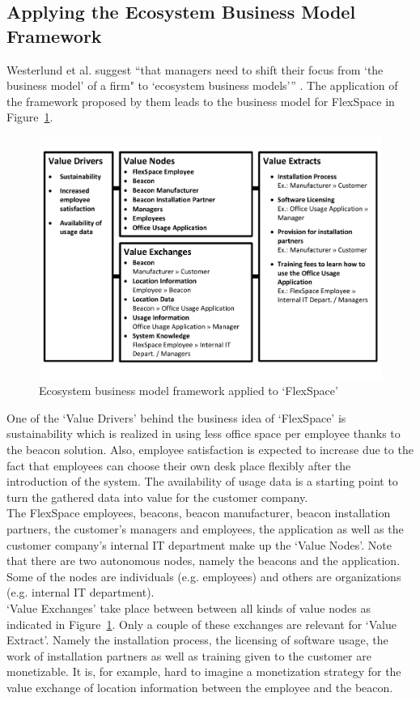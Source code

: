 	\subsection{Applying the Ecosystem Business Model Framework}
	\vspace{-1em}
		Westerlund et al. suggest ``that managers need to shift their focus from `the business model' of a firm" to `ecosystem business models''' \cite{westerlund}. The application of the framework proposed by them leads to the business model for FlexSpace in Figure~\ref{fig:use_case_westerlund}.
		\begin{figure}[ht]
		    \begin{center}
		    \includegraphics[scale=0.55]{Talk11/use_case_westerlund.pdf}
		    \end{center}
		    \caption{Ecosystem business model framework applied to `FlexSpace'}
		    \label{fig:use_case_westerlund}
		\end{figure}
		One of the `Value Drivers' behind the business idea of `FlexSpace' is sustainability which is realized in using less office space per employee thanks to the beacon solution. Also, employee satisfaction is expected to increase due to the fact that employees can choose their own desk place flexibly after the introduction of the system. The availability of usage data is a starting point to turn the gathered data into value for the customer company.\\
		The FlexSpace employees, beacons, beacon manufacturer, beacon installation partners, the customer's managers and employees, the application as well as the customer company's internal IT department make up the `Value Nodes'. Note that there are two autonomous nodes, namely the beacons and the application. Some of the nodes are individuals (e.g. employees) and others are organizations (e.g. internal IT department).\\
		`Value Exchanges' take place between between all kinds of value nodes as indicated in Figure~\ref{fig:use_case_westerlund}. Only a couple of these exchanges are relevant for `Value Extract'. Namely the installation process, the licensing of software usage, the work of installation partners as well as training given to the customer are monetizable. It is, for example, hard to imagine a monetization strategy for the value exchange of location information between the employee and the beacon.
	\vspace{-1em}
